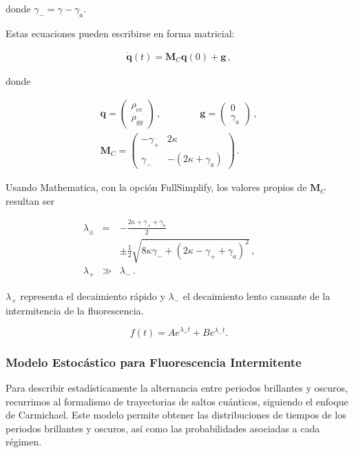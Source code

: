 \documentclass[12pt]{article}
\begin{document}
donde $\gamma_- = \gamma - \gamma_a$.

Estas ecuaciones pueden escribirse en forma matricial:

\begin{eqnarray}
\dot{\mathbf{q}}(t) = \mathbf{M}_C \mathbf{q}(0) +\mathbf{g} 	\,,
\end{eqnarray}

donde

\begin{eqnarray}
\mathbf{q} = \left( \begin{array}{c} \rho_{ee} \\ \rho_{gg} \end{array}  \right) \,, 
	\qquad \qquad
\mathbf{g} = \left( \begin{array}{c} 0 \\ \gamma_a \end{array}  \right) \,, \\
\mathbf{M}_C = \left( \begin{array}{cc} -\gamma_+ & 2\kappa \\ 
	\gamma_- & -(2\kappa +\gamma_a)  \end{array}  \right) \,.  
\end{eqnarray}

Usando Mathematica, con la opción FullSimplify, los valores propios de $\mathbf{M}_C$ resultan ser

\begin{subequations}
\begin{eqnarray}
\lambda_{\pm} &=& - \frac{2\kappa +\gamma_+ +\gamma_a}{2} \nonumber \\
	&&\pm \frac{1}{2} 
	\sqrt{ 8\kappa \gamma_- +(2\kappa -\gamma_+ +\gamma_a)^2  } \,, 
	\qquad \\
\lambda_+ &\gg& \lambda_- \,.  
\end{eqnarray}
\end{subequations}

$\lambda_+$ representa el decaimiento rápido y $\lambda_-$ el decaimiento lento causante de la intermitencia de la fluorescencia.

$$ f(t) = A e^{\lambda_+ t} + B e^{\lambda_- t} .$$


\subsubsection{Modelo Estocástico para Fluorescencia Intermitente}

Para describir estadísticamente la alternancia entre periodos brillantes y oscuros, recurrimos al formalismo de trayectorias de saltos cuánticos, siguiendo el enfoque de Carmichael. Este modelo permite obtener las distribuciones de tiempos de los periodos brillantes y oscuros, así como las probabilidades asociadas a cada régimen.
\end{document}
